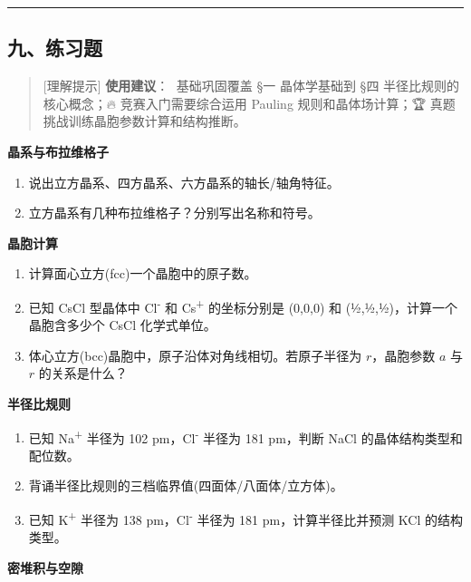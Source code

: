 \documentclass[a4paper,11pt]{ctexart}
\newcommand{\箭}{\ensuremath{\rightarrow}}
\newcommand{\左箭}{\ensuremath{\leftarrow}}
\newcommand{\上箭}{\ensuremath{\uparrow}}
\newcommand{\下箭}{\ensuremath{\downarrow}}
\newcommand{\衡}{\ensuremath{\rightleftharpoons}}
\newcommand{\双箭}{\ensuremath{\leftrightarrow}}
\newcommand{\约等于}{\ensuremath{\approx}}
\newcommand{\小于等于}{\ensuremath{\leq}}
\newcommand{\大于等于}{\ensuremath{\geq}}
\newcommand{\不等于}{\ensuremath{\neq}}
\newcommand{\西格马}{\ensuremath{\sigma}}
\newcommand{\派}{\ensuremath{\pi}}
\begin{document}
\begin{center}\rule{0.5\linewidth}{0.5pt}\end{center}

\subsection{九、练习题}\label{ux4e5dux7ec3ux4e60ux9898}

\begin{quote}
{[}理解提示{]} \textbf{使用建议}：🌱 基础巩固覆盖 §一 晶体学基础到 §四 半径比规则的核心概念；🔥 竞赛入门需要综合运用 Pauling 规则和晶体场计算；🏆 真题挑战训练晶胞参数计算和结构推断。
\end{quote}

\textbf{晶系与布拉维格子}

\begin{enumerate}
\def\labelenumi{\arabic{enumi}.}
\item
  说出立方晶系、四方晶系、六方晶系的轴长/轴角特征。
\item
  立方晶系有几种布拉维格子？分别写出名称和符号。
\end{enumerate}

\textbf{晶胞计算}

\begin{enumerate}
\def\labelenumi{\arabic{enumi}.}
\setcounter{enumi}{2}
\item
  计算面心立方(fcc)一个晶胞中的原子数。
\item
  已知 CsCl 型晶体中 Cl\textsuperscript{-} 和 Cs\textsuperscript{+} 的坐标分别是 (0,0,0) 和 (½,½,½)，计算一个晶胞含多少个 CsCl 化学式单位。
\item
  体心立方(bcc)晶胞中，原子沿体对角线相切。若原子半径为 \(r\)，晶胞参数 \(a\) 与 \(r\) 的关系是什么？
\end{enumerate}

\textbf{半径比规则}

\begin{enumerate}
\def\labelenumi{\arabic{enumi}.}
\setcounter{enumi}{5}
\item
  已知 Na\textsuperscript{+} 半径为 102 pm，Cl\textsuperscript{-} 半径为 181 pm，判断 NaCl 的晶体结构类型和配位数。
\item
  背诵半径比规则的三档临界值(四面体/八面体/立方体)。
\item
  已知 K\textsuperscript{+} 半径为 138 pm，Cl\textsuperscript{-} 半径为 181 pm，计算半径比并预测 KCl 的结构类型。
\end{enumerate}

\textbf{密堆积与空隙}
\end{document}
